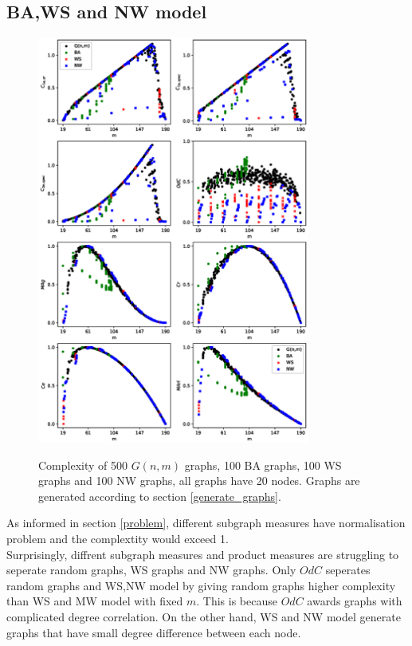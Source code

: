 \documentclass[12pt]{article}
\begin{document}
\subsection{BA,WS and NW model}
\label{complexity_sp}
\begin{figure}[ht]
    \centering
    \includegraphics[width = 0.8\textwidth]{complexities_sp.eps}
    \label{fig:graph_models}
    \caption{Complexity of 500 $G(n,m)$ graphs, 100 BA graphs, 100 WS graphs and 100 NW graphs, all graphs have 20 nodes. Graphs are generated according to section \ref{generate_graphs}.}
\end{figure}
\noindent
As informed in section \ref{problem}, different subgraph measures have normalisation problem and the complextity would exceed 1.\\
Surprisingly, diffrent subgraph measures and product measures are struggling to seperate random graphs, WS graphs and NW graphs. Only $OdC$ seperates random graphs and WS,NW model by giving random graphs higher complexity than WS and MW model with fixed $m$. This is because $OdC$ awards graphs with complicated degree correlation. On the other hand, WS and NW model generate graphs that have small degree difference between each node.\\
\end{document}
